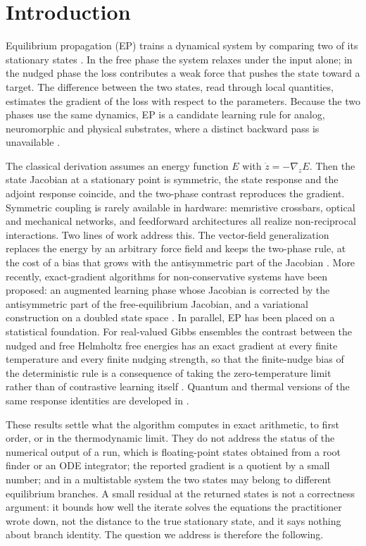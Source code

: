 \documentclass[11pt]{article}
\theoremstyle{definition}
\theoremstyle{remark}
\newcommand{\grad}{\nabla}
\begin{document}
\tableofcontents

\section{Introduction}

Equilibrium propagation (EP) trains a dynamical system by comparing two of its stationary
states \cite{scellier2017}. In the free phase the system relaxes under the input alone; in the
nudged phase the loss contributes a weak force that pushes the state toward a target. The
difference between the two states, read through local quantities, estimates the gradient of the
loss with respect to the parameters. Because the two phases use the same dynamics, EP is a
candidate learning rule for analog, neuromorphic and physical substrates, where a distinct
backward pass is unavailable \cite{kendall2020,yi2023,hoier2023}.

The classical derivation assumes an energy function $E$ with $\dot z = -\grad_z E$. Then the
state Jacobian at a stationary point is symmetric, the state response and the adjoint response
coincide, and the two-phase contrast reproduces the gradient. Symmetric coupling is rarely
available in hardware: memristive crossbars, optical and mechanical networks, and
feedforward architectures all realize non-reciprocal interactions. Two lines of work address
this. The vector-field generalization replaces the energy by an arbitrary force field and keeps
the two-phase rule, at the cost of a bias that grows with the antisymmetric part of the Jacobian
\cite{scellier2018,laborieux2024}. More recently, exact-gradient algorithms for non-conservative
systems have been proposed: an augmented learning phase whose Jacobian is corrected by the
antisymmetric part of the free-equilibrium Jacobian, and a variational construction on a doubled
state space \cite{scurria2026}. In parallel, EP has been placed on a statistical foundation.
For real-valued Gibbs ensembles the contrast between the nudged and free Helmholtz free energies
has an exact gradient at every finite temperature and every finite nudging strength, so that the
finite-nudge bias of the deterministic rule is a consequence of taking the zero-temperature limit
rather than of contrastive learning itself \cite{litman2026}. Quantum and thermal versions of the
same response identities are developed in \cite{massar2025}.

These results settle what the algorithm computes in exact arithmetic, to first order, or in the
thermodynamic limit. They do not address the status of the numerical output of a run, which is
floating-point states obtained from a root finder or an ODE integrator; the reported gradient is
a quotient by a small number; and in a multistable system the two states may belong to different
equilibrium branches. A small residual at the returned states is not a correctness argument:
it bounds how well the iterate solves the equations the practitioner wrote down, not the distance
to the true stationary state, and it says nothing about branch identity. The question we address
is therefore the following.
\end{document}
